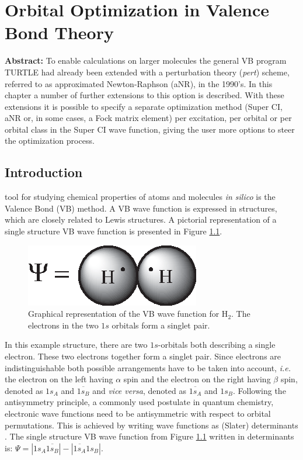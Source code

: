 \chapter{Orbital Optimization in Valence Bond Theory}
\label{chap_orbopt}


\noindent\textbf{Abstract:} To enable calculations on larger molecules the general VB program TURTLE  had already been extended with a perturbation theory (\textit{pert}) scheme, referred to as approximated Newton-Raphson (aNR), in the 1990's. In this chapter a number of further extensions to this option is described. With these extensions it is possible to specify a separate optimization method (Super CI, aNR or, in some cases, a Fock matrix element) per excitation, per orbital or per orbital class in the Super CI wave function, giving the user more options to steer the optimization process.

\newpage

\section{Introduction}

\lettrine{}{} tool for studying chemical properties of atoms and molecules \textit{in silico} is the Valence Bond (VB) \cite{heitler,weeny1,weeny2,weeny3} method. A VB wave function is expressed in structures, which are closely related to Lewis structures. A pictorial representation of a single structure VB wave function is presented in Figure \ref{ch2.fig.heitler}.  
\begin{figure}[ht]
\center
\includegraphics{orbopt/figures/heitler.eps}
\caption{Graphical representation of the VB wave function for H$_2$. The electrons in the two $1s$ orbitals form a singlet pair.}
\label{ch2.fig.heitler}
\end{figure}
In this example structure, there are two $1s$-orbitals both describing a single electron. These two electrons together form a singlet pair. Since electrons are indistinguishable both possible arrangements have to be taken into account, \textit{i.e.} the electron on the left having $\alpha$ spin and the electron on the right having $\beta$ spin, denoted as $1s_{A}$ and $\overline{1s_{B}}$ and \textit{vice versa}, denoted as $\overline{1s_{A}}$ and $1s_{B}$. Following the antisymmetry principle, a commonly used postulate in quantum chemistry, electronic wave functions need to be antisymmetric with respect to orbital permutations. This is achieved by writing wave functions as (Slater) determinants \cite{slater}. The single structure VB wave function from Figure \ref{ch2.fig.heitler} written in determinants is: $\Psi = |1s_{A}\overline{1s_{B}}| - |\overline{1s_{A}}1s_{B}|$.
 
